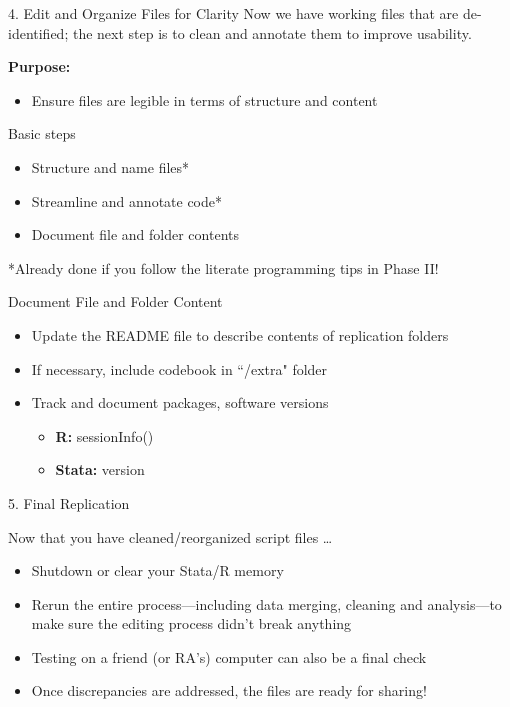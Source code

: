 \documentclass[12pt, compress]{beamer} %
\renewcommand{\texttt}[2][ceruleanblue]{\textcolor{#1}{\ttfamily #2}}%
\let\noteitem\item %
\renewcommand{\item}{ 
	\noteitem\vspace{\fill}
	}
\newcommand{\nb}[1]{{\color{burntorange} {#1}}}
\begin{document}
 	\begin{frame}{4. Edit and Organize Files for Clarity}
 	Now we have working files that are de-identified; the next step is to clean and annotate them to improve usability. 
 	
 	\bigskip
 	
 		\textbf{Purpose:}
 		\begin{itemize}
 			\item Ensure files are \textcolor{burntorange}{legible} in terms of structure and content
 		\end{itemize}
 	\end{frame}
  
 	\begin{frame}{Basic steps}
 		\begin{itemize}
 			\item Structure and name files*
 			\item Streamline and annotate code*
 			\item Document file and folder contents
 		\end{itemize}
 		
 		\bigskip
 		\nb{*Already done if you follow the literate programming tips in Phase II!}
 	\end{frame}
 
\begin{frame}{Document File and Folder Content}
	\begin{itemize}
		\item Update the README file to describe contents of replication folders
		\item If necessary, include codebook in ``\texttt{/extra}" folder
		\item Track and document packages, software versions
		\begin{itemize}
			\item \textbf{R:} \texttt{sessionInfo()}
			\item \textbf{Stata:} \texttt{version}
		\end{itemize}
	\end{itemize}
\end{frame}
	

\begin{frame}{5. Final Replication}
	
		Now that you have cleaned/reorganized script files \dots 
		
		\begin{itemize}
			\item Shutdown or clear your Stata/R memory
			\item Rerun the entire process---including data merging, cleaning and analysis---to make sure the editing process didn't break anything
			\item Testing on a friend (or RA's) computer can also be a final check
			\item Once discrepancies are addressed, the files are ready for sharing!
		\end{itemize}
	
\end{frame}
\end{document}
